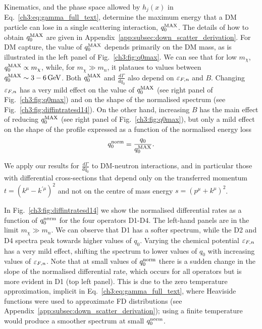 Kinematics, and the phase space allowed by $h_j(x)$ in Eq.~\ref{ch3:eq:gamma_full_text}, determine the maximum energy that a DM particle can lose in a single scattering interaction, $q_0^{\rm MAX}$. The details of how to obtain $q_0^{\rm MAX}$ are given in Appendix~\ref{app:subsec:down_scatter_derivation}.
For DM capture, the value of $q_0^{\rm MAX}$ depends primarily on the DM mass, as is illustrated in the left panel of Fig.~\ref{ch3:fig:q0max}. We can see that for low $m_\chi$, $q_0^{\rm MAX}\propto m_\chi$, while, for $m_\chi\gg m_n$, it plataues to values between $q_0^{\rm MAX}\sim 3 - 6 {\rm \,GeV}$. 
%
Both $q_0^{\rm MAX}$ and $\frac{d\Gamma}{dq_0}$ also depend on $\varepsilon_{F,n}$ and $B$. Changing $\varepsilon_{F,n}$ has a very mild effect on the value of $q_0^{\rm MAX}$ (see right panel of Fig.~\ref{ch3:fig:q0max}) and on the shape of the normalised spectrum (see Fig.~\ref{ch3:fig:diffintratesd14}). On the other hand, increasing $B$ has the main effect of reducing   $q_0^{\rm MAX}$ (see right panel of Fig.~\ref{ch3:fig:q0max}), but only a mild effect on the shape of the profile expressed as a function of the normalised energy loss 
\begin{equation}
    q_0^{\rm norm} = \frac{q_0}{q_0^{\rm MAX}}. 
\end{equation}

We apply our results for $\frac{d\Gamma}{d q_0}$ to DM-neutron interactions, and in particular those with differential cross-sections that depend only on the transferred momentum $t=(k^\mu-k^{'\mu})^2$ and not on the centre of mass energy $s=(p^\mu+k^\mu)^2$.

In Fig.~\ref{ch3:fig:diffintratesd14} we show the normalised differential rates as a function of $q_0^{\rm norm}$ for the four operators D1-D4. The left-hand panels are in the limit $m_\chi\gg m_n$. We can observe that D1 has a softer spectrum, while the D2 and D4 spectra peak towards higher values of $q_0$. Varying the chemical potential $\varepsilon_{F,n}$ has a very mild effect, shifting the spectrum to lower values of $q_0$ with increasing values of $\varepsilon_{F,n}$.
Note that at small values of $q_0^{\rm norm}$ there is a sudden change in the slope of the normalised differential rate, which occurs for all operators but is more evident in D1 (top left panel). This is due to the zero temperature approximation, implicit in Eq.~\ref{ch3:eq:gamma_full_text}, where Heaviside functions were used to approximate FD distributions (see Appendix~\ref{app:subsec:down_scatter_derivation}); using a finite temperature would produce a smoother spectrum at small $q_0^{\rm norm}$. 

